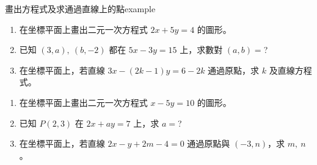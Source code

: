\documentclass[bwprint,a4paper]{extarticle}
\begin{document}
\begin{question}{畫出方程式及求通過直線上的點}{example}
	\begin{enumerate}
		\item 在坐標平面上畫出二元一次方程式 $2x+5y=4$ 的圖形。	  
		\item 已知 $(3,a),\ (b,-2)$ 都在 $5x-3y=15$ 上，求數對 $(a,b)=$?
		\item 在坐標平面上，若直線 $3x-(2k-1)y=6-2k$ 通過原點，求 $k$ 及直線方程式。
	\end{enumerate}
\end{question}
\vspace{40ex}
\begin{observing}
	\begin{enumerate}
		\item 在坐標平面上畫出二元一次方程式 $x-5y=10$ 的圖形。	  
		\item 已知 $P(2,3)$ 在 $2x+ay=7$ 上，求 $a=$?
		\item 在坐標平面上，若直線 $2x-y+2m-4=0$ 通過原點與 $(-3,n)$，求 $m,\ n$。
	\end{enumerate}
\end{observing}
\newpage
\end{document}
